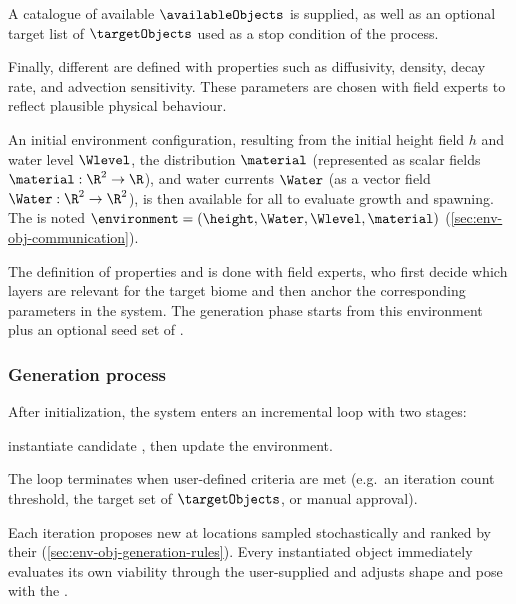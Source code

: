 A catalogue of available  $\availableObjects$ is supplied, as well as an optional target list of  $\targetObjects$ used as a stop condition of the process.

Finally, different  are defined with properties such as diffusivity, density, decay rate, and advection sensitivity. These parameters are chosen with field experts to reflect plausible physical behaviour.

An initial environment configuration, resulting from the initial height field $h$ and water level $\Wlevel$, the  distribution $\material$ (represented as scalar fields $\material: \R^2 \to \R$), and water currents $\Water$ (as a vector field $\Water: \R^2 \to \R^2$), is then available for all  to evaluate growth and spawning. The  is noted $\environment = (\height, \Water, \Wlevel, \material)$ (\cref{sec:env-obj-communication}).

The definition of  properties and  is done with field experts, who first decide which  layers are relevant for the target biome and then anchor the corresponding parameters in the system.
The generation phase starts from this environment plus an optional seed set of .

\subsubsection{Generation process}

After initialization, the system enters an incremental loop with two stages:
\begin{Itemize}
\Item{-} instantiate candidate , then
\Item{-} update the environment.
\end{Itemize}
The loop terminates when user-defined criteria are met (e.g.\ an iteration count threshold, the target set of  $\targetObjects$, or manual approval).


Each iteration proposes new  at locations sampled stochastically and ranked by their  (\cref{sec:env-obj-generation-rules}).
Every instantiated object immediately evaluates its own viability through the user-supplied  and adjusts shape and pose with the .


